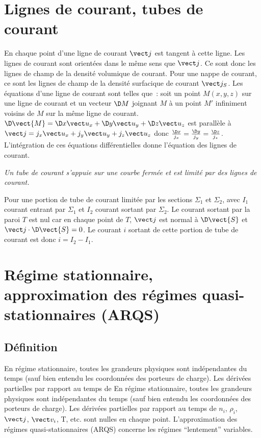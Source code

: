 \section{Lignes de courant, tubes de courant}
\label{chap9-sec:lignesdecourant}

En chaque point d'une ligne de courant $\vj$ est tangent à  cette ligne. Les lignes de courant sont orientées dans le même sens que $\vj$. Ce sont donc les lignes de champ de la densité volumique de courant. Pour une nappe de courant, ce sont les lignes de champ de la densité surfacique de courant $\vj_S$.
Les équations d'une ligne de courant sont telles que~: soit un point $M(x,y,z)$ sur une ligne de courant et un vecteur $\D M$ joignant $M$ à un point $M'$ infiniment voisins de $M$ sur la même ligne de courant.
$\D \vect{M} = \D x \ux + \D y \uy + \D z \uz$ est parallèle à  $\vj = j_x \ux + j_y \uy + j_z \uz$ donc $\frac{\D x}{j_x} = \frac{\D y}{j_y} = \frac{\D z}{j_z}$. L'intégration de ces équations différentielles donne l'équation des lignes de courant.

\emph{Un tube de courant s'appuie sur une courbe fermée et est limité par des lignes de courant.}

Pour une portion de tube de courant limitée par les sections $\Sigma_1$ et $\Sigma_2$, avec $I_1$ courant entrant par $\Sigma_1$ et $I_2$ courant sortant par $\Sigma_2$. Le courant sortant par la paroi $T$ est nul car en chaque point de $T$, $\vj$ est normal à $\D \vect{S}$ et $\vj \cdot \D \vect{S} = 0$. Le courant $i$ sortant de cette portion de tube de courant est donc $i = I_2 - I_1$.

\section{Régime stationnaire, approximation des régimes quasi-stationnaires (ARQS)}
\label{chap9-sec:ARQS}

\subsection{Définition}
\label{chap9-sec:def}

En régime stationnaire, toutes les grandeurs physiques sont indépendantes du temps (sauf bien entendu les coordonnées des porteurs de charge). Les dérivées partielles par rapport au temps de En régime stationnaire, toutes les grandeurs physiques sont indépendantes du temps (sauf bien entendu les coordonnées des porteurs de charge).
Les dérivées partielles par rapport au temps de $n_i$, $\rho_i$, $\vj$, $\vv_i$, T, etc. sont nulles en chaque point. L'approximation des régimes quasi-stationnaires (ARQS) concerne les régimes ``lentement'' variables. 

